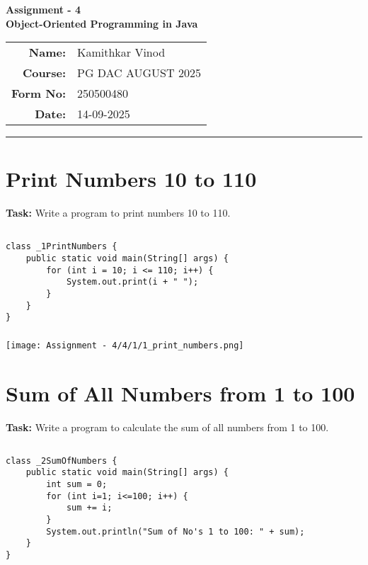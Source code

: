 \documentclass[12pt,a4paper]{article}
\begin{document}
\begin{center}
    \LARGE \textbf{Assignment - 4} \\[0.5cm]
    \Large \textbf{Object-Oriented Programming in Java} \\[1cm]

    \begin{tabular}{rl}
        \textbf{Name:} & Kamithkar Vinod \\
        \textbf{Course:} & PG DAC AUGUST 2025 \\
        \textbf{Form No:} & 250500480 \\
        \textbf{Date:} & 14-09-2025 \\
    \end{tabular}
\end{center}

\vspace{1cm}
\hrule
\vspace{0.5cm}


\section{Print Numbers 10 to 110}
\textbf{Task:} Write a program to print numbers 10 to 110.

\subsection{}
\begin{lstlisting}
class _1PrintNumbers {
    public static void main(String[] args) {
        for (int i = 10; i <= 110; i++) {
            System.out.print(i + " ");
        }
    }
}
\end{lstlisting}

\subsubsection{}
\begin{center}
    \texttt{[image: Assignment - 4/4/1/1\_print\_numbers.png]}
\end{center}

\section{Sum of All Numbers from 1 to 100}
\textbf{Task:} Write a program to calculate the sum of all numbers from 1 to 100.

\subsection{}
\begin{lstlisting}
class _2SumOfNumbers {
    public static void main(String[] args) {
        int sum = 0;
        for (int i=1; i<=100; i++) {
            sum += i;
        }
        System.out.println("Sum of No's 1 to 100: " + sum);
    }
}
\end{lstlisting}
\end{document}
